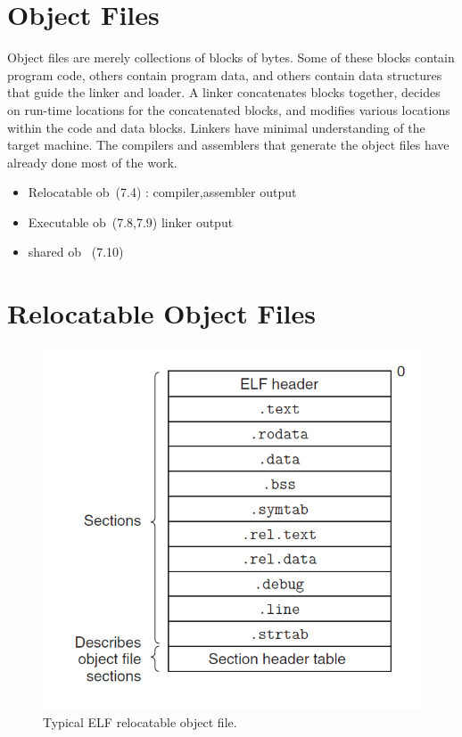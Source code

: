 \section{Object Files}

Object files are merely collections of blocks
of bytes. Some of these blocks contain program code, others contain program
data, and others contain data structures that guide the linker and loader. A linker
concatenates blocks together, decides on run-time locations for the concatenated
blocks, and modifies various locations within the code and data blocks. Linkers
have minimal understanding of the target machine. The compilers and assemblers
that generate the object files have already done most of the work.


\begin{itemize}
    \item Relocatable ob~(7.4) : compiler,assembler output
    \item Executable ob~(7.8,7.9) linker output
    \item shared ob~ (7.10)
\end{itemize}



\section{Relocatable Object Files}


\begin{figure}[h!]
    \centering
    \includegraphics[scale=0.5]{pic/section7/pic2.png}
    \caption{Typical ELF relocatable object file.}
\end{figure}


